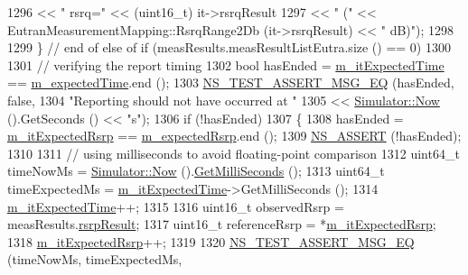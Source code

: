 \begin{DoxyCode}
1296                              << \textcolor{stringliteral}{" rsrq="} << (uint16\_t) it->rsrqResult
1297                              << \textcolor{stringliteral}{" ("} << EutranMeasurementMapping::RsrqRange2Db (it->rsrqResult) << \textcolor{stringliteral}{" dB)"});
1298 
1299         \} \textcolor{comment}{// end of else of if (measResults.measResultListEutra.size () == 0)}
1300 
1301       \textcolor{comment}{// verifying the report timing}
1302       \textcolor{keywordtype}{bool} hasEnded = \hyperlink{classLteUeMeasurementsPiecewiseTestCase2_a49b9123d994ebabacb649491774d231d}{m\_itExpectedTime} == \hyperlink{classLteUeMeasurementsPiecewiseTestCase2_affb68ca4f88019ca3b9aadbefe29d908}{m\_expectedTime}.end ();
1303       \hyperlink{group__testing_ga2a9d78cffb3db8e867c35fff0b698cf5}{NS\_TEST\_ASSERT\_MSG\_EQ} (hasEnded, \textcolor{keyword}{false},
1304                              \textcolor{stringliteral}{"Reporting should not have occurred at "}
1305                              << \hyperlink{group__simulator_gac3635e2e87f7ce316c89290ee1b01d0d}{Simulator::Now} ().GetSeconds () << \textcolor{stringliteral}{"s"});
1306       \textcolor{keywordflow}{if} (!hasEnded)
1307         \{
1308           hasEnded = \hyperlink{classLteUeMeasurementsPiecewiseTestCase2_adf38952334ae0b1372acdc5004420a01}{m\_itExpectedRsrp} == \hyperlink{classLteUeMeasurementsPiecewiseTestCase2_a657edc6c75b0ebc54cebca3ba7bb166f}{m\_expectedRsrp}.end ();
1309           \hyperlink{assert_8h_a6dccdb0de9b252f60088ce281c49d052}{NS\_ASSERT} (!hasEnded);
1310 
1311           \textcolor{comment}{// using milliseconds to avoid floating-point comparison}
1312           uint64\_t timeNowMs = \hyperlink{group__simulator_gac3635e2e87f7ce316c89290ee1b01d0d}{Simulator::Now} ().\hyperlink{classns3_1_1Time_aba3428a8b6c4c8d9014ce44145081f34}{GetMilliSeconds} ();
1313           uint64\_t timeExpectedMs = \hyperlink{classLteUeMeasurementsPiecewiseTestCase2_a49b9123d994ebabacb649491774d231d}{m\_itExpectedTime}->GetMilliSeconds ();
1314           \hyperlink{classLteUeMeasurementsPiecewiseTestCase2_a49b9123d994ebabacb649491774d231d}{m\_itExpectedTime}++;
1315 
1316           uint16\_t observedRsrp = measResults.\hyperlink{structns3_1_1LteRrcSap_1_1MeasResults_a4d7bf8765525493fe5f5cccdbf94ab8b}{rsrpResult};
1317           uint16\_t referenceRsrp = *\hyperlink{classLteUeMeasurementsPiecewiseTestCase2_adf38952334ae0b1372acdc5004420a01}{m\_itExpectedRsrp};
1318           \hyperlink{classLteUeMeasurementsPiecewiseTestCase2_adf38952334ae0b1372acdc5004420a01}{m\_itExpectedRsrp}++;
1319 
1320           \hyperlink{group__testing_ga2a9d78cffb3db8e867c35fff0b698cf5}{NS\_TEST\_ASSERT\_MSG\_EQ} (timeNowMs, timeExpectedMs,

\end{DoxyCode}
